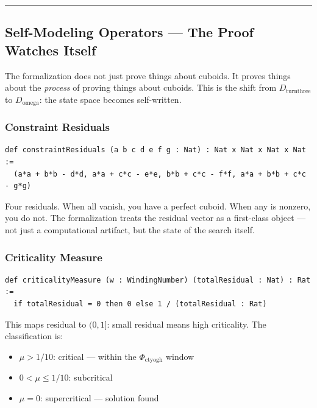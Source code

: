 \documentclass[12pt,a4paper]{article}
\begin{document}
\begin{center}
\rule{0.5\textwidth}{0.4pt}
\end{center}

\subsection{Self-Modeling Operators --- The Proof Watches Itself}

The formalization does not just prove things about cuboids. It proves things about the \emph{process} of proving things about cuboids. This is the shift from $D_{\text{turnthree}}$ to $D_{\text{omega}}$: the state space becomes self-written.

\subsubsection{Constraint Residuals}

\begin{lstlisting}[language=lean]
def constraintResiduals (a b c d e f g : Nat) : Nat x Nat x Nat x Nat :=
  (a*a + b*b - d*d, a*a + c*c - e*e, b*b + c*c - f*f, a*a + b*b + c*c - g*g)
\end{lstlisting}

Four residuals. When all vanish, you have a perfect cuboid. When any is nonzero, you do not. The formalization treats the residual vector as a first-class object --- not just a computational artifact, but the state of the search itself.

\subsubsection{Criticality Measure}

\begin{lstlisting}[language=lean]
def criticalityMeasure (w : WindingNumber) (totalResidual : Nat) : Rat :=
  if totalResidual = 0 then 0 else 1 / (totalResidual : Rat)
\end{lstlisting}

This maps residual to $(0, 1]$: small residual means high criticality. The classification is:

\begin{itemize}
    \item $\mu > 1/10$: critical --- within the $\Phi_{\text{ctyogh}}$ window
    \item $0 < \mu \leq 1/10$: subcritical
    \item $\mu = 0$: supercritical --- solution found
\end{itemize}
\end{document}
